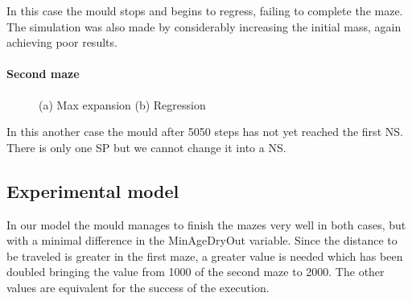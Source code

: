 In this case the mould stops and begins to regress, failing to complete the maze. The simulation was also made by considerably increasing the initial mass, again achieving poor results.

\paragraph{Second maze}

\begin{figure}[H]
    \centering
    \caption{(a) Max expansion (b) Regression}
    \label{fig:foobar}
\end{figure}

In this another case the mould after 5050 steps has not yet reached the first NS. There is only one SP but we cannot change it into a NS.

\subsection{Experimental model}
\label{experimental_model}

In our model the mould manages to finish the mazes very well in both cases, but with a minimal difference in the MinAgeDryOut variable. Since the distance to be traveled is greater in the first maze, a greater value is needed which has been doubled bringing the value from 1000 of the second maze to 2000. The other values are equivalent for the success of the execution.

